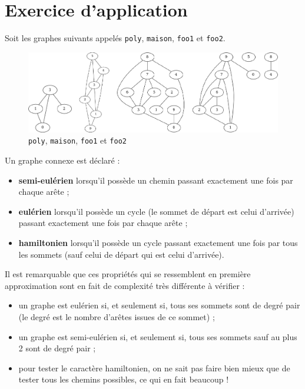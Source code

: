 \section*{Exercice d'application}

Soit les graphes suivants appelés \lstinline{poly}, \lstinline{maison}, \lstinline{foo1} et \lstinline{foo2}.
\begin{figure}[H]
		\includegraphics[width=\linewidth]{images/figure_01}
	\caption{ \lstinline{poly}, \lstinline{maison}, \lstinline{foo1} et \lstinline{foo2}}
\end{figure}



Un graphe connexe est déclaré :
\begin{itemize}
\item \textbf{semi-eulérien} lorsqu’il possède un chemin passant exactement une fois par chaque arête ;
\item \textbf{eulérien} lorsqu’il possède un cycle (le sommet de départ est celui d’arrivée) passant exactement
une fois par chaque arête ;
\item \textbf{hamiltonien} lorsqu’il possède un cycle passant exactement une fois par tous les sommets (sauf
celui de départ qui est celui d’arrivée).
\end{itemize}


Il est remarquable que ces propriétés qui se ressemblent en première approximation sont en fait de
complexité très différente à vérifier :
\begin{itemize}
\item un graphe est eulérien si, et seulement si, tous ses sommets sont de degré pair (le degré est le
nombre d’arêtes issues de ce sommet) ;
\item un graphe est semi-eulérien si, et seulement si, tous ses sommets sauf au plus 2 sont de degré
pair ;
\item pour tester le caractère hamiltonien, on ne sait pas faire bien mieux que de tester tous les
chemins possibles, ce qui en fait beaucoup ! %
\end{itemize}

